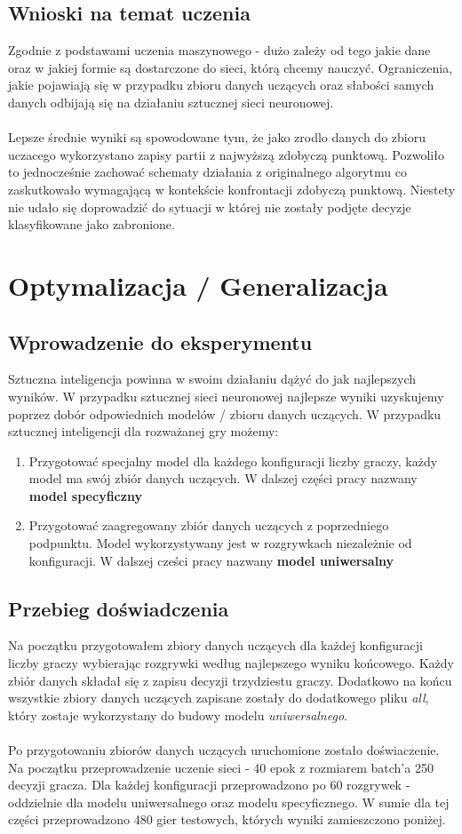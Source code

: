 \documentclass[12pt, oneside]{report}
\begin{document}
\section{Wnioski na temat uczenia}
Zgodnie z podstawami uczenia maszynowego - dużo zależy od tego jakie dane oraz w jakiej formie są dostarczone do sieci, którą chcemy nauczyć. Ograniczenia, jakie pojawiają się w przypadku zbioru danych uczących oraz słabości samych danych odbijają się na działaniu sztucznej sieci neuronowej. \\ \\ 
Lepsze średnie wyniki są spowodowane tym, że jako zrodlo danych do zbioru uczacego wykorzystano zapisy partii z najwyższą zdobyczą punktową. Pozwoliło to jednocześnie zachować schematy działania z originalnego algorytmu co zaskutkowało wymagającą w kontekście konfrontacji zdobyczą punktową. Niestety nie udało się doprowadzić do sytuacji w której nie zostały podjęte decyzje klasyfikowane jako zabronione. 
\chapter{Optymalizacja / Generalizacja}
\section{Wprowadzenie do eksperymentu}
Sztuczna inteligencja powinna w swoim działaniu dążyć do jak najlepszych wyników. W przypadku sztucznej sieci neuronowej najlepsze wyniki uzyskujemy poprzez dobór odpowiednich modelów / zbioru danych uczących. W przypadku sztucznej inteligencji dla rozważanej gry możemy:

\begin{enumerate}
	\item Przygotować specjalny model dla każdego konfiguracji liczby graczy, każdy model ma swój zbiór danych uczących. W dalszej części pracy nazwany \textbf{model specyficzny}
	\item Przygotować zaagregowany zbiór danych uczących z poprzedniego podpunktu. Model wykorzystywany jest w rozgrywkach niezależnie od konfiguracji. W dalszej cześci pracy nazwany \textbf{model uniwersalny}
\end{enumerate}

\section{Przebieg doświadczenia}
Na początku przygotowałem zbiory danych uczących dla każdej konfiguracji liczby graczy wybierając rozgrywki według najlepszego wyniku końcowego. Każdy zbiór danych składał się z zapisu decyzji trzydziestu graczy. Dodatkowo na końcu wszystkie zbiory danych uczących zapisane zostały do dodatkowego pliku \textit{all}, który zostaje wykorzystany do budowy modelu \textit{uniwersalnego}. \\ \\
Po przygotowaniu zbiorów danych uczących uruchomione zostało doświaczenie. Na początku przeprowadzenie uczenie sieci - 40 epok z rozmiarem batch'a 250 decyzji gracza. Dla każdej konfiguracji przeprowadzono po 60 rozgrywek - oddzielnie dla modelu uniwersalnego oraz modelu specyficznego. W sumie dla tej części przeprowadzono 480 gier testowych, których wyniki zamieszczono poniżej.
\end{document}
